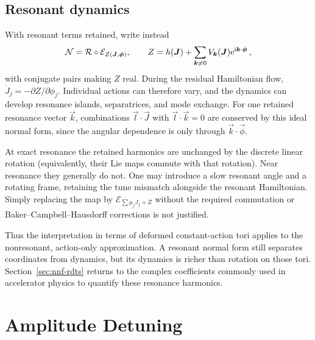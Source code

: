 \subsection{Resonant dynamics}

With resonant terms retained, write instead
\begin{equation}\label{eq:nnf-resonant-map}
    \mathcal N = \mathcal R\circ\mathcal E_{Z(\bm{J},\bm{\phi})},\qquad
    Z = h(\bm{J}) + \sum_{\bm{k}\ne0}
    V_{\bm{k}}(\bm{J})\mathrm{e}^{\mathrm{i}\bm{k}\cdot\bm{\phi}}\,,
\end{equation}
with conjugate pairs making $Z$ real.  During the residual Hamiltonian
flow, $\dot J_j = -\partial Z/\partial\phi_j$.  Individual actions can
therefore vary, and the dynamics can develop resonance islands,
separatrices, and mode exchange.  For one retained resonance vector
$\vec k$, combinations $\vec l\cdot\vec J$ with
$\vec l\cdot\vec k = 0$ are conserved by this ideal normal form, since the
angular dependence is only through $\vec k\cdot\vec\phi$.

At exact resonance the retained harmonics are unchanged by the discrete
linear rotation (equivalently, their Lie maps commute with that rotation).
Near resonance they generally do not.  One may introduce a
slow resonant angle and a rotating frame, retaining the tune mismatch
alongside the resonant Hamiltonian.  Simply replacing the map by
$\mathcal E_{\sum\mu_jJ_j + Z}$ without the required commutation or
Baker--Campbell--Hausdorff corrections is not justified.

Thus the interpretation in terms of deformed constant-action tori applies
to the nonresonant, action-only approximation.  A resonant normal form
still separates coordinates from dynamics, but its dynamics is richer
than rotation on those tori.  Section~\ref{sec:nnf-rdts} returns to the
complex coefficients commonly used in accelerator physics to quantify these
resonance harmonics.


\section{Amplitude Detuning}\label{sec:nnf-detuning}

